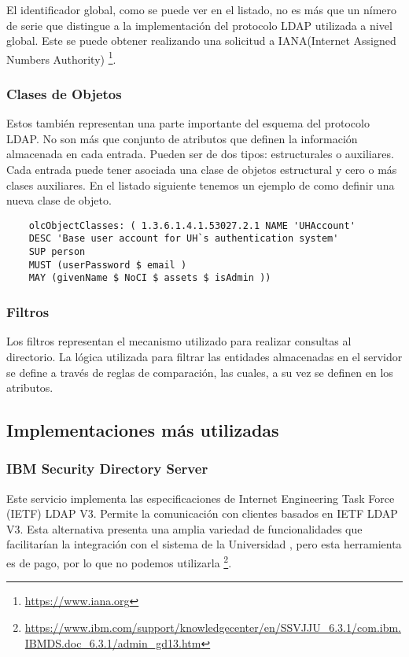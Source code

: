 El identificador global, como se puede ver en el listado, no es más que un nímero de serie 
que distingue a la implementación del protocolo LDAP utilizada a nivel global. Este se puede 
obtener realizando una solicitud a IANA(Internet Assigned Numbers Authority)
\footnote{ \url{https://www.iana.org}}.

\subsubsection{Clases de Objetos}
Estos también representan una parte importante del esquema del protocolo LDAP. No son más que 
conjunto de atributos que definen la información almacenada en cada entrada. Pueden ser de 
dos tipos: estructurales o auxiliares. Cada entrada puede tener asociada una clase de 
objetos estructural y cero o más clases auxiliares. En el listado siguiente tenemos un ejemplo
de como definir una nueva clase de objeto.

\begin{lstlisting}
	olcObjectClasses: ( 1.3.6.1.4.1.53027.2.1 NAME 'UHAccount'
	DESC 'Base user account for UH`s authentication system'
	SUP person
	MUST (userPassword $ email )
	MAY (givenName $ NoCI $ assets $ isAdmin ))
\end{lstlisting}

\subsubsection{Filtros}
Los filtros representan el mecanismo utilizado para realizar consultas al directorio. 
La lógica utilizada para filtrar las entidades almacenadas en el servidor se define a través 
de reglas de comparación, las cuales, a su vez se definen en los atributos.

\subsection{Implementaciones más utilizadas}
\subsubsection{IBM Security Directory Server}
Este servicio implementa las especificaciones de Internet Engineering Task Force (IETF) LDAP 
V3. Permite la comunicación con clientes basados en IETF LDAP V3. Esta alternativa presenta 
una amplia variedad de funcionalidades que facilitarían la integración con el sistema de la 
Universidad , pero esta herramienta es de pago, por lo que no podemos utilizarla
\footnote{ \url{https://www.ibm.com/support/knowledgecenter/en/SSVJJU_6.3.1/com.ibm.IBMDS.doc_6.3.1/admin_gd13.htm} }.

